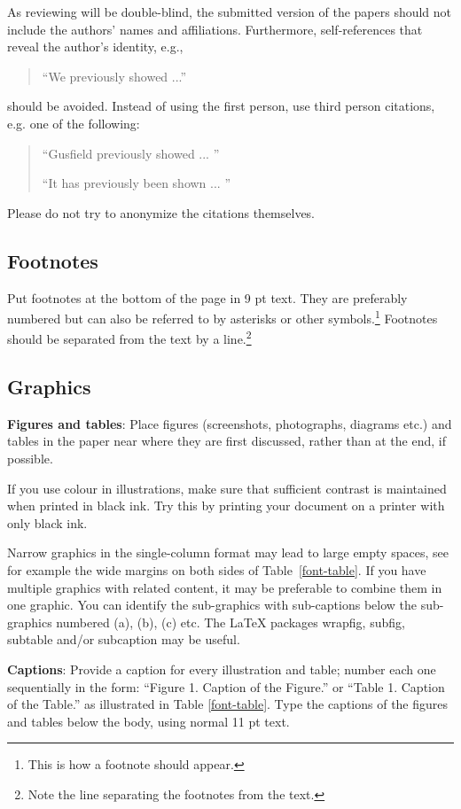 \documentclass{clarin}
\begin{document}
{As reviewing will be double-blind, the submitted version of the papers
should not include the authors' names and affiliations. Furthermore,
self-references that reveal the author's identity, e.g.,
\begin{quote}
``We previously showed \cite{Gusfield:97} ...''
\end{quote}
should be avoided. Instead of using the first person, use third person citations, e.g. one of the following:
\begin{quote}
``Gusfield 
previously showed ... ''

``It has previously been shown ... \cite{Gusfield:97}''
\end{quote}
Please do not try to anonymize the citations themselves.

\subsection{Footnotes}

Put footnotes at the bottom of the page in 9 pt
text. They are preferably numbered but can also be referred to by asterisks or other
symbols.\footnote{This is how a footnote should appear.} Footnotes
should be separated from the text by a line.\footnote{Note the line
separating the footnotes from the text.}

\subsection{Graphics}

{\bf Figures and tables}: Place figures (screenshots, photographs, diagrams etc.)
and tables in the paper near where they are first discussed,
rather than at the end, if possible.

If you use colour in illustrations, make sure that sufficient contrast is maintained
when printed in black ink. Try this by printing your document on a printer
with only black ink.

Narrow graphics in the single-column format may lead to
large empty spaces,
see for example the wide margins on both sides of Table~\ref{font-table}.
If you have multiple graphics with related content, it may be
preferable to combine them in one graphic.
You can identify the sub-graphics with sub-captions below the
sub-graphics numbered (a), (b), (c) etc.
The LaTeX packages wrapfig, subfig, subtable and/or subcaption
may be useful.


{\bf Captions}: Provide a caption for every illustration and table; number each one
sequentially in the form:  ``Figure 1. Caption of the Figure.'' or ``Table 1.
Caption of the Table.'' as illustrated in Table \ref{font-table}.
Type the captions of the figures and
tables below the body, using normal 11 pt text.


}
\end{document}
